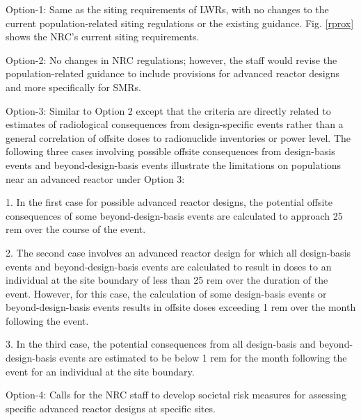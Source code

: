 \documentclass[10pt,a4paper]{article}
\begin{document}
Option-1: Same as the siting requirements of LWRs, with no changes to the current population-related siting regulations or the existing guidance. Fig. \ref{rprox} shows the NRC’s current siting requirements. 

Option-2:  No changes in NRC regulations; however, the staff would revise the population-related guidance to include provisions for advanced reactor designs and more specifically for SMRs.

Option-3: Similar to Option 2 except that the criteria are directly related to estimates of radiological consequences from design-specific events rather than a general correlation of offsite doses to radionuclide inventories or power level. 
The following three cases involving possible offsite consequences from design-basis events and beyond-design-basis events illustrate the limitations on populations near an advanced reactor under Option 3:

1. In the first case for possible advanced reactor designs, the potential offsite consequences of some beyond-design-basis events are calculated to approach 25 rem
over the course of the event.

2. The second case involves an advanced reactor design for which all design-basis events and beyond-design-basis events are calculated to result in doses to an individual at the site boundary of less than 25 rem over the duration of the event. However, for this case, the calculation of some design-basis events or beyond-design-basis events results in offsite doses exceeding 1 rem over the month following the event. 

3. In the third case, the potential consequences from all design-basis and beyond-design-basis events are estimated to be below 1 rem for the month following the event for an individual at the site boundary.

Option-4: Calls for the NRC staff to develop societal risk measures for assessing specific advanced reactor designs at specific sites. 
\end{document}
